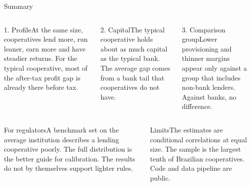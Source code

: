 \documentclass[aspectratio=169,10pt]{beamer}
\newcommand{\card}[3]{\begin{block}{#2}\scriptsize #3\end{block}}%
\begin{document}
\begin{frame}{Summary}
\vspace{0.2cm}
\begin{columns}[T]
\card{3.9cm}{1. Profile}{At the same size, cooperatives lend more, run leaner, earn more and have steadier returns. For the typical cooperative, most of the after-tax profit gap is already there before tax.}
\card{3.9cm}{2. Capital}{The typical cooperative holds about as much capital as the typical bank. The average gap comes from a bank tail that cooperatives do not have.}
\card{3.9cm}{3. Comparison group}{Lower provisioning and thinner margins appear only against a group that includes non-bank lenders. Against banks, no difference.}
\end{columns}
\vspace{0.3cm}
\begin{columns}[T]
\card{5.8cm}{For regulators}{A benchmark set on the average institution describes a lending cooperative poorly. The full distribution is the better guide for calibration. The results do not by themselves support lighter rules.}
\card{5.8cm}{Limits}{The estimates are conditional correlations at equal size. The sample is the largest tenth of Brazilian cooperatives. Code and data pipeline are public.}
\end{columns}
\end{frame}
\end{document}
